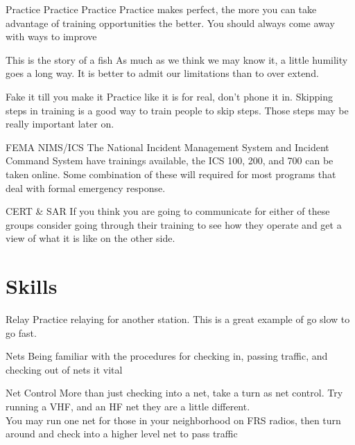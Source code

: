 \documentclass[11pt]{beamer}
\begin{document}
\begin{frame}{Practice Practice Practice}
Practice makes perfect, the more you can take advantage of training opportunities the better. You should always come away with ways to improve
\end{frame}

\begin{frame}{This is the story of a fish}
As much as we think we may know it, a little humility goes a long way. It is better to admit our limitations than to over extend.
\end{frame}

\begin{frame}{Fake it till you make it}
Practice like it is for real, don't phone it in. Skipping steps in training is a good way to train people to skip steps. Those steps may be really important later on.
\end{frame}

\begin{frame}{FEMA NIMS/ICS}
The National Incident Management System and Incident Command System have trainings available, the ICS 100, 200, and 700 can be taken online. Some combination of these will required for most programs that deal with formal emergency response. 
\end{frame}

\begin{frame}{CERT \& SAR}
If you think you are going to communicate for either of these groups consider going through their training to see how they operate and get a view of what it is like on the other side.
\end{frame}

\section{Skills}

\begin{frame}{Relay}
Practice relaying for another station. This is a great example of go slow to go fast.
\end{frame}

\begin{frame}{Nets}
Being familiar with the procedures for checking in, passing traffic, and checking out of nets it vital
\end{frame}

\begin{frame}{Net Control}
More than just checking into a net, take a turn as net control. Try running a VHF, and an HF net they are a little different. \\ You may run one net for those in your neighborhood on FRS radios, then turn around and check into a higher level net to pass traffic
\end{frame}
\end{document}
